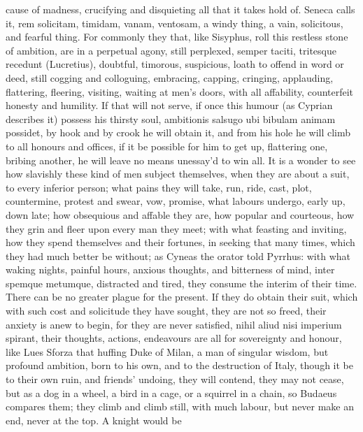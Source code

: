 {cause of madness, crucifying and disquieting all that it takes hold of.
Seneca calls it, rem solicitam, timidam, vanam, ventosam, a windy
thing, a vain, solicitous, and fearful thing. For commonly they that,
like Sisyphus, roll this restless stone of ambition, are in a perpetual
agony, still  perplexed, semper taciti, tritesque recedunt
(Lucretius), doubtful, timorous, suspicious, loath to offend in word or
deed, still cogging and colloguing, embracing, capping, cringing,
applauding, flattering, fleering, visiting, waiting at men's doors,
with all affability, counterfeit honesty and humility. If that
will not serve, if once this humour (as Cyprian describes it)
possess his thirsty soul, ambitionis salsugo ubi bibulam animam
possidet, by hook and by crook he will obtain it, and from his hole he
will climb to all honours and offices, if it be possible for him to get
up, flattering one, bribing another, he will leave no means unessay'd
to win all. It is a wonder to see how slavishly these kind of men
subject themselves, when they are about a suit, to every inferior
person; what pains they will take, run, ride, cast, plot, countermine,
protest and swear, vow, promise, what labours undergo, early up, down
late; how obsequious and affable they are, how popular and courteous,
how they grin and fleer upon every man they meet; with what feasting
and inviting, how they spend themselves and their fortunes, in seeking
that many times, which they had much better be without; as Cyneas
the orator told Pyrrhus: with what waking nights, painful hours,
anxious thoughts, and bitterness of mind, inter spemque metumque,
distracted and tired, they consume the interim of their time. There can
be no greater plague for the present. If they do obtain their suit,
which with such cost and solicitude they have sought, they are not so
freed, their anxiety is anew to begin, for they are never satisfied,
nihil aliud nisi imperium spirant, their thoughts, actions, endeavours
are all for sovereignty and honour, like Lues Sforza that huffing
Duke of Milan, a man of singular wisdom, but profound ambition, born to
his own, and to the destruction of Italy, though it be to their own
ruin, and friends' undoing, they will contend, they may not cease, but
as a dog in a wheel, a bird in a cage, or a squirrel in a chain, so
Budaeus compares them; they climb and climb still, with
much labour, but never make an end, never at the top. A knight would be
}
